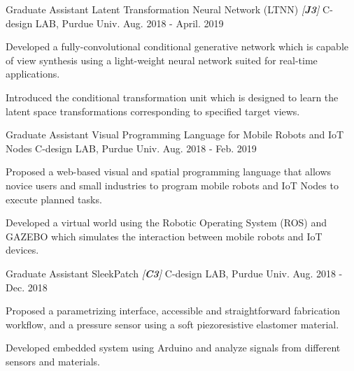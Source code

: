 \begin{cventries}

\cventry
{Graduate Assistant} %
{Latent Transformation Neural Network (LTNN) \textit{[\textbf{J3}]}} %
{C-design LAB, Purdue Univ.} %
{Aug. 2018 - April. 2019} %
{ %
\begin{cvitems}
\item {Developed a fully-convolutional conditional generative network which is capable of view synthesis using a light-weight neural network suited for real-time applications.}
\item {Introduced the conditional transformation unit which is designed to learn the latent space transformations corresponding to specified target views.}
\end{cvitems}
}


\cventry
{Graduate Assistant} %
{Visual Programming Language for Mobile Robots and IoT Nodes} %
{C-design LAB, Purdue Univ.} %
{Aug. 2018 - Feb. 2019} %
{ %
\begin{cvitems}
\item {Proposed a web-based visual and spatial programming language that allows novice users and small industries to program mobile robots and IoT Nodes to execute planned tasks.}
\item {Developed a virtual world using the Robotic Operating System (ROS) and GAZEBO which simulates the interaction between mobile robots and IoT devices.}
\end{cvitems} 
}


\cventry
{Graduate Assistant} %
{SleekPatch \textit{[\textbf{C3}]}} %
{C-design LAB, Purdue Univ.} %
{Aug. 2018 - Dec. 2018} %
{ %
\begin{cvitems}
\item {Proposed a parametrizing interface, accessible and straightforward fabrication workflow, and a pressure sensor using a soft piezoresistive elastomer material.}
\item {Developed embedded system using Arduino and analyze signals from different sensors and materials.}
\end{cvitems}
}


\end{cventries}
